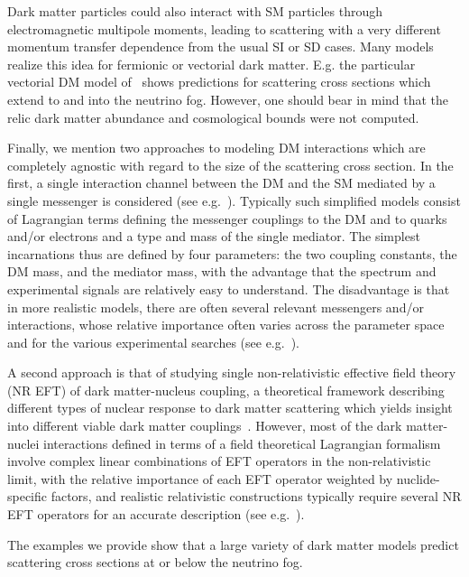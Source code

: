  
 Dark matter particles could also interact with SM particles through electromagnetic multipole moments, leading to scattering with a very different momentum transfer dependence from the usual SI or SD cases.   Many models realize this idea for fermionic or vectorial dark matter. E.g. the particular vectorial DM model of~\cite{Hisano:2020qkq} shows predictions for scattering cross sections which extend to and into the neutrino fog.  However, one should bear in mind that the relic dark matter abundance and cosmological bounds were not computed.  
 
Finally, we mention two approaches to modeling DM interactions which are completely agnostic with regard to the size of the scattering cross section. 
In the first, a single interaction channel between the DM and the SM mediated by a single messenger is considered (see e.g.~\cite{Gelmini:2018ogy}).  Typically such simplified models consist of Lagrangian terms defining the messenger couplings to the DM and to quarks and/or electrons and a type and mass of the single mediator. The simplest incarnations thus are defined by four parameters: the two coupling constants, the DM mass, and the mediator mass,
with the advantage that the spectrum and experimental signals are relatively easy to understand.  The disadvantage is that in more realistic models, there are often several relevant messengers and/or interactions, whose relative importance often varies across the parameter space and for the various experimental searches (see e.g.~\cite{Profumo:2013hqa}).

A second approach is that of studying single non-relativistic effective field theory (NR EFT) of dark matter-nucleus coupling, a theoretical framework describing different types of nuclear response to dark matter scattering which yields insight into different viable dark matter couplings~\cite{Fitzpatrick:2012ix}. However, most of the dark matter-nuclei interactions defined in terms of a field theoretical Lagrangian formalism involve complex linear combinations of EFT operators in the non-relativistic limit, with the relative importance of each EFT operator weighted by nuclide-specific factors, and realistic relativistic constructions typically require several NR EFT operators for an accurate description (see e.g.~\cite{Gresham:2014vja}).

The examples we provide show that a large variety of dark matter models predict scattering cross sections at or below the neutrino fog.

